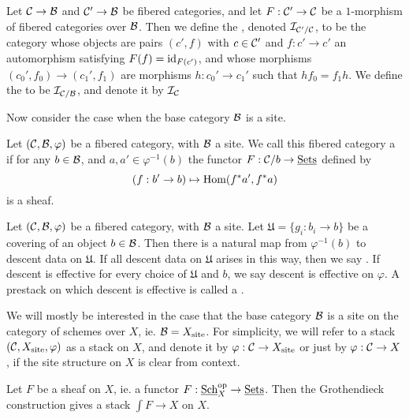 \begin{defn}
Let $\mathcal{C}\rightarrow\mathcal{B}$ and $\mathcal{C}'\rightarrow\mathcal{B}$ be fibered categories, and let $F:\mathcal{C}'\rightarrow\mathcal{C}$ be a $1$-morphism of fibered categories over $\mathcal{B}$.  Then we define the , denoted $\mathcal{I}_{\mathcal{C}'/\mathcal{C}}$, to be the category whose objects are pairs $(c',f)$ with $c\in \mathcal{C}'$ and $f:c'\rightarrow c'$ an automorphism satisfying $F(f) = \textnormal{id}_{F(c')}$, and whose morphisms $(c_0',f_0)\rightarrow (c_1',f_1)$ are morphisms $h: c_0'\rightarrow c_1'$ such that $hf_0 = f_1h$.  We define the  to be $\mathcal{I}_{\mathcal{C}/\mathcal{B}}$, and denote it by $\mathcal{I}_{\mathcal{C}}$
\end{defn}

Now consider the case when the base category $\mathcal{B}$ is a site.
\begin{defn}
Let $(\mathcal{C},\mathcal{B},\varphi)$ be a fibered category, with $\mathcal{B}$ a site.  We call this fibered category a  if for any $b\in\mathcal{B}$, and $a,a'\in\varphi^{-1}(b)$ the functor $F:\mathcal{C}/b\rightarrow\textnormal{\underline{Sets}}$ defined by
$$(f:b'\rightarrow b)\mapsto \textnormal{Hom}(f^*a',f^*a)$$
is a sheaf.
\end{defn}

\begin{defn}
Let $(\mathcal{C},\mathcal{B},\varphi)$ be a fibered category, with $\mathcal{B}$ a site.  Let $\mathfrak U = \{g_i: b_i\rightarrow b\}$ be a covering of an object $b\in\mathcal{B}$.  Then there is a natural map from $\varphi^{-1}(b)$ to descent data on $\mathfrak U$.  If all descent data on $\mathfrak U$ arises in this way, then we say .  If descent is effective for every choice of $\mathfrak U$ and $b$, we say descent is effective on $\varphi$.  A prestack on which descent is effective is called a .
\end{defn}

We will mostly be interested in the case that the base category $\mathcal{B}$ is a site on the category of schemes over $X$, ie. $\mathcal{B} = X_{\text{site}}$.  For simplicity, we will refer to a stack $(\mathcal{C},X_{\text{site}},\varphi)$ as a stack on $X$, and denote it by $\varphi: \mathcal{C}\rightarrow X_{\text{site}}$ or just by $\varphi:\mathcal{C}\rightarrow X$, if the site structure on $X$ is clear from context.

\begin{ex}
Let $F$ be a sheaf on $X$, ie. a functor $F:\textnormal{\underline{Sch}}_X^{\text{op}}\rightarrow\textnormal{\underline{Sets}}$.  Then the Grothendieck construction gives a stack $\int F\rightarrow X$ on $X$.
\end{ex}

